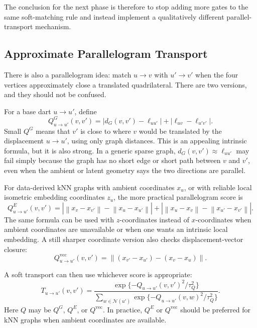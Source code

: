 \documentclass[11pt]{article}
\newcommand{\N}{\mathcal N}
\newcommand{\norm}[1]{\left\lVert #1 \right\rVert}
\begin{document}
The conclusion for the next phase is therefore to stop adding more gates to
the same soft-matching rule and instead implement a qualitatively different
parallel-transport mechanism.

\subsection{Approximate Parallelogram Transport}

There is also a parallelogram idea: match \(u\to v\) with \(u'\to v'\) when the
four vertices approximately close a translated quadrilateral.  There are two
versions, and they should not be confused.

For a base dart \(u\to u'\), define
\[
  Q^{G}_{u\to u'}(v,v')
  =
  \left|d_G(v,v')-\ell_{uu'}\right|
  +
  \left|\ell_{uv}-\ell_{u'v'}\right|.
\]
Small \(Q^G\) means that \(v'\) is close to where \(v\) would be translated by
the displacement \(u\to u'\), using only graph distances.  This is an appealing
intrinsic formula, but it is also strong.  In a generic sparse graph,
\(d_G(v,v')\approx \ell_{uu'}\) may fail simply because the graph has no short
edge or short path between \(v\) and \(v'\), even when the ambient or latent
geometry says the two directions are parallel.

For data-derived kNN graphs with ambient coordinates \(x_u\), or with reliable
local isometric embedding coordinates \(z_u\), the more practical
parallelogram score is
\[
  Q^{E}_{u\to u'}(v,v')
  =
  \left|
  \norm{x_v-x_{v'}}-\norm{x_u-x_{u'}}
  \right|
  +
  \left|
  \norm{x_u-x_v}-\norm{x_{u'}-x_{v'}}
  \right|.
\]
The same formula can be used with \(z\)-coordinates instead of \(x\)-coordinates
when ambient coordinates are unavailable or when one wants an intrinsic local
embedding.  A still sharper coordinate version also checks displacement-vector
closure:
\[
  Q^{\mathrm{vec}}_{u\to u'}(v,v')
  =
  \norm{(x_{v'}-x_{u'})-(x_v-x_u)}.
\]

A soft transport can then use whichever score is appropriate:
\[
  T_{u\to u'}(v,v')
  =
  \frac{\exp\{-Q_{u\to u'}(v,v')^2/\tau_Q^2\}}
       {\sum_{w\in\N(u')}\exp\{-Q_{u\to u'}(v,w)^2/\tau_Q^2\}}.
\]
Here \(Q\) may be \(Q^G\), \(Q^E\), or \(Q^{\mathrm{vec}}\).  In practice,
\(Q^E\) or \(Q^{\mathrm{vec}}\) should be preferred for kNN graphs when
ambient coordinates are available.
\end{document}
